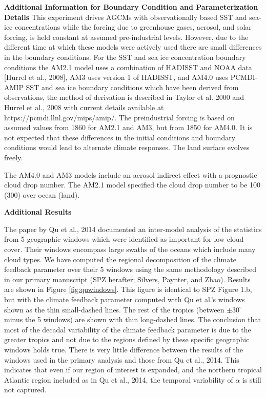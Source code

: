 \documentclass[draft,grl]{agutexSI}
\begin{document}
\begin{article}
\noindent\textbf{Additional Information for Boundary Condition and Parameterization Details}
This experiment drives AGCMs with observationally based SST and sea-ice concentrations while the forcing due to greenhouse gases, aerosol, and solar forcing, is held constant at assumed pre-industrial levels.  However, due to the different time at which these models were actively used there are small differences in the boundary conditions. 
For the SST and sea ice concentration boundary conditions the AM2.1 model uses a combination of HADISST and NOAA data [Hurrel et al., 2008], AM3 uses version 1 of HADISST, and AM4.0 uses PCMDI-AMIP SST and sea ice boundary conditions which have been derived from observations, the method of derivation is described in Taylor et al. 2000 and Hurrel et al., 2008 with current details available at https://pcmdi.llnl.gov/mips/amip/.  The preindustrial forcing is based on assumed values from 1860 for AM2.1 and AM3, but from 1850 for AM4.0.  It is not expected that these differences in the initial conditions and boundary conditions would lead to alternate climate responses.  The land surface evolves freely.  

The AM4.0 and AM3 models include an aerosol indirect effect with a prognostic cloud drop number.  The AM2.1 model specified the cloud drop number to be 100 (300) over ocean (land).


\noindent\textbf{Additional Results}

The paper by Qu et al., 2014 documented an inter-model analysis of the statistics from 5 geographic windows which were identified as important for low cloud cover.  Their windows encompass large swaths of the oceans which include many cloud types.  We have computed the regional decomposition of the climate feedback parameter over their 5 windows using the same methodology described in our primary manuscript (SPZ herafter; Silvers, Paynter, and Zhao).  Results are shown in Figure \ref{fig:quwindows}.  
This figure is identical to SPZ Figure 1.b, but with the climate feedback parameter computed with Qu et al.'s windows shown as the thin small-dashed lines.   
The rest of the tropics (between $\pm 30^{\circ}$ minus the 5 windows) are shown with thin long-dashed lines.  The conclusion that most of the decadal variability of the climate feedback parameter is due to the greater tropics and not due to the regions defined by these specific geographic windows holds true.  There is very little difference between the results of the windows used in the primary analysis and those from Qu et al., 2014.  This indicates that even if our region of interest is expanded, and the northern tropical Atlantic region included as in Qu et al., 2014, the temporal variability of $\alpha$ is still not captured.  


\end{article}
\end{document}
